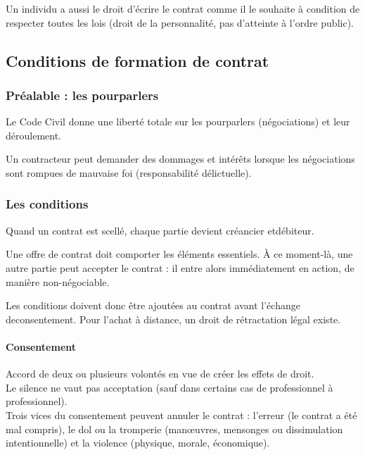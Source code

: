 \documentclass[10pt,a4paper,french]{article}
\begin{document}
Un individu a aussi le droit d'écrire le contrat comme il le souhaite à condition de respecter toutes les lois (droit de la personnalité, pas d'atteinte à l'ordre public).

\subsection{Conditions de formation de contrat}

\subsubsection{Préalable : les pourparlers}
Le Code Civil donne une liberté totale sur les pourparlers (négociations) et leur déroulement.

Un contracteur peut demander des dommages et intérêts lorsque les négociations sont rompues de mauvaise foi (responsabilité délictuelle).

\subsubsection{Les conditions}

Quand un contrat est scellé, chaque partie devient créancier etdébiteur.

Une offre de contrat doit comporter les éléments essentiels. À ce moment-là, une autre partie peut accepter le contrat : il entre alors immédiatement en action, de manière non-négociable.

Les conditions doivent donc être ajoutées au contrat avant l'échange deconsentement. Pour l'achat à distance, un droit de rétractation légal existe.

\paragraph{Consentement}
Accord de deux ou plusieurs volontés en vue de créer les effets de droit. \\
Le silence ne vaut pas acceptation (sauf dans certains cas de professionnel à professionnel). \\
Trois vices du consentement peuvent annuler le contrat : l'erreur (le contrat a été mal compris), le dol ou la tromperie (manœuvres, mensonges ou dissimulation intentionnelle) et la violence (physique, morale, économique).
\end{document}
